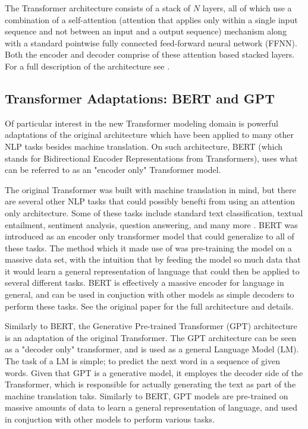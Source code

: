 The Transformer architecture consists of a stack of $N$ layers, all of which use a combination of a self-attention (attention that applies only within a single input sequence and not between an input and a output sequence)  mechanism along with a standard pointwise fully connected feed-forward neural network (FFNN). Both the encoder and decoder comprise of these attention based stacked layers. For a full description of the architecture see \cite{vaswani2017attention}. 

\subsection{Transformer Adaptations: BERT and GPT}
Of particular interest in the new Transformer modeling domain is powerful adaptations of the original architecture which have been applied to many other NLP tasks besides machine translation. On such architecture, BERT (which stands for Bidirectional Encoder Representations from Transformers), uses what can be referred to as an "encoder only" Transformer model. 

The original Transformer was built with machine translation in mind, but there are several other NLP tasks that could possibly benefti from using an attention only architecture. Some of these tasks include standard text classification, textual entailment, sentiment analysis, question answering, and many more . BERT was introduced as an encoder only transformer model that could generalize to all of these tasks. The method which it made use of was pre-training the model on a massive data set, with the intuition that by feeding the model so much data that it would learn a general representation of language that could then be applied to several different tasks. BERT is effectively a massive encoder for language in general, and can be used in conjuction with other models as simple decoders to perform these tasks. See the original paper\cite{devlin2018bert} for the full architecture and details. 

Similarly to BERT, the Generative Pre-trained Transformer (GPT) architecture\cite{radford2019language} is an adaptation of the original Transformer. The GPT architecture can be seen as a "decoder only" transformer, and is used as a general Language Model (LM). The task of a LM is simple; to predict the next word in a sequence of given words. Given that GPT is a generative model, it employes the decoder side of the Transformer, which is responsible for actually generating the text as part of the machine translation taks. Similarly to BERT, GPT models are pre-trained on massive amounts of data to learn a general representation of language, and used in conjuction with other models to perform various tasks. 

